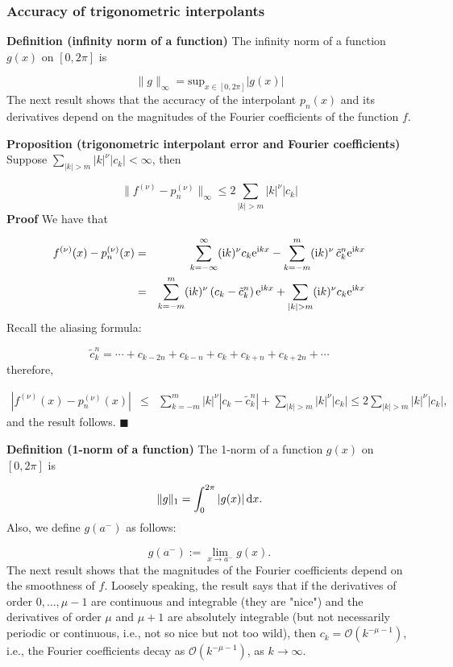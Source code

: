 \documentclass[12pt,a4paper]{article}
\begin{document}
\subsubsection{Accuracy of trigonometric interpolants}
\textbf{Definition (infinity norm of a function)} The infinity norm of a function $g(x)$ on $[0, 2\pi]$ is 

\[
\| g \|_{\infty} = \mathrm{sup}_{x\in[0,2\pi]} \vert g(x) \vert
\]
The next result shows that the accuracy of the interpolant $p_n(x)$ and its derivatives depend on the magnitudes of the Fourier coefficients of the function $f$. 

\textbf{Proposition (trigonometric interpolant error and Fourier coefficients)} Suppose $\sum_{\vert k \vert > m} \vert k \vert^{\nu} \vert c_k \vert < \infty$, then

\[
\| f^{(\nu)} - p_n^{(\nu)}  \|_{\infty} \leq  2\sum_{\vert k \vert > m} \vert k \vert^{\nu} \vert c_k \vert 
\]
\textbf{Proof} We have that


\begin{eqnarray*}
f^{(\nu)}(x) - p^{(\nu)}_n(x) & = & \sum_{k=-\infty}^{\infty}({\rm i}k)^{\nu}c_k{\rm e}^{{\rm i}kx} - \sum_{k=-m}^{m}({\rm i}k)^{\nu}\,\tilde{c}^n_k{\rm e}^{{\rm i}kx} \\
 &=& \sum_{k=-m}^{m}({\rm i}k)^{\nu}\left(c_k - \tilde{c}^n_k\right){\rm e}^{{\rm i}kx} + \sum_{\vert k \vert > m} ({\rm i}k)^{\nu}c_k{\rm e}^{{\rm i}kx}
\end{eqnarray*}
Recall the aliasing formula:

\[
\tilde{c}^n_k = \cdots + c_{k-2n} + c_{k-n} +  c_k +  c_{k+n} + c_{k+2n} + \cdots
\]
therefore,


\begin{eqnarray}
\left\vert f^{(\nu)}(x) - p^{(\nu)}_n(x) \right\vert & \leq &  \sum_{k=-m}^{m} \vert k\vert^{\nu}\left\vert c_k - \tilde{c}^n_k\right\vert + \sum_{\vert k \vert > m} \vert k \vert^{\nu} \vert c_k \vert \leq  2\sum_{\vert k \vert > m} \vert k \vert^{\nu} \vert c_k \vert,
\end{eqnarray}
and the result follows.  $\blacksquare$

\textbf{Definition (1-norm of a function)} The 1-norm of a function $g(x)$ on $[0, 2\pi]$ is

\[
\| g \|_1 = \int_{0}^{2\pi}  \vert g(x) \vert \, {\rm d}x. 
\]
Also, we define $g(a^{-})$ as follows:

\[
g(a^{-}) :=\lim_{x\to a^{-}} g(x).
\]
The next result shows that the magnitudes of the Fourier coefficients depend on the smoothness of $f$. Loosely speaking, the result says that if the derivatives of order $0, \ldots, \mu-1$ are continuous and integrable (they are "nice") and the derivatives of order $\mu$ and $\mu+1$ are absolutely integrable (but not necessarily periodic or continuous, i.e., not so nice but not too wild), then $c_k = \mathcal{O}(k^{-\mu-1})$, i.e., the Fourier coefficients decay as $\mathcal{O}(k^{-\mu-1})$, as $k \to \infty$.
\end{document}
